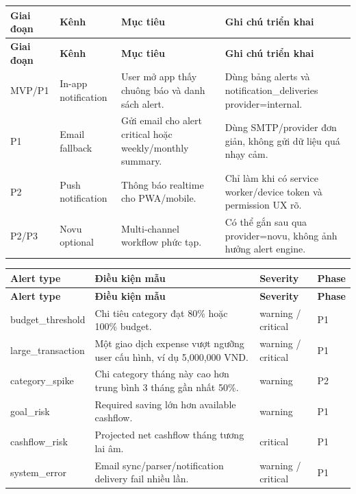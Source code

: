 \documentclass[11pt,a4paper]{article}
\renewcommand{\thead}[1]{\textbf{\color{PrimaryDark}#1}}
\newenvironment{tableblock}{\Needspace{8\baselineskip}\vspace{0.25em}}{\vspace{0.75em}}
\begin{document}
\begin{tableblock}
\scriptsize
\begin{longtable}{L{2.2cm}L{3.0cm}L{5.0cm}L{5.2cm}}
\thead{Giai đoạn} & \thead{Kênh} & \thead{Mục tiêu} & \thead{Ghi chú triển khai} \\
\endfirsthead
{}\thead{Giai đoạn} & \thead{Kênh} & \thead{Mục tiêu} & \thead{Ghi chú triển khai} \\
\endhead
MVP/P1 & In-app notification & User mở app thấy chuông báo và danh sách alert. & Dùng bảng alerts và notification\_deliveries provider=internal. \\
P1 & Email fallback & Gửi email cho alert critical hoặc weekly/monthly summary. & Dùng SMTP/provider đơn giản, không gửi dữ liệu quá nhạy cảm. \\
P2 & Push notification & Thông báo realtime cho PWA/mobile. & Chỉ làm khi có service worker/device token và permission UX rõ. \\
P2/P3 & Novu optional & Multi-channel workflow phức tạp. & Có thể gắn sau qua provider=novu, không ảnh hưởng alert engine. \\
\end{longtable}
\end{tableblock}

\begin{tableblock}
\scriptsize
\begin{longtable}{L{3.0cm}L{7.0cm}L{2.4cm}L{1.7cm}}
\thead{Alert type} & \thead{Điều kiện mẫu} & \thead{Severity} & \thead{Phase} \\
\endfirsthead
{}\thead{Alert type} & \thead{Điều kiện mẫu} & \thead{Severity} & \thead{Phase} \\
\endhead
budget\_threshold & Chi tiêu category đạt 80\% hoặc 100\% budget. & warning / critical & P1 \\
large\_transaction & Một giao dịch expense vượt ngưỡng user cấu hình, ví dụ 5,000,000 VND. & warning / critical & P1 \\
category\_spike & Chi category tháng này cao hơn trung bình 3 tháng gần nhất 50\%. & warning & P2 \\
goal\_risk & Required saving lớn hơn available cashflow. & warning & P1 \\
cashflow\_risk & Projected net cashflow tháng tương lai âm. & critical & P1 \\
system\_error & Email sync/parser/notification delivery fail nhiều lần. & warning / critical & P1 \\
\end{longtable}
\end{tableblock}
\end{document}
